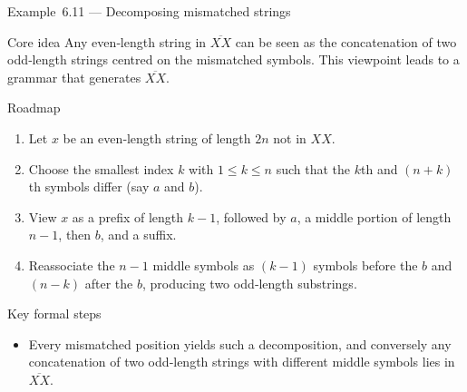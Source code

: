 \begin{frame}[t]{Example 6.11 — Decomposing mismatched strings}
  \begin{tblock}{Core idea}
    Any even‑length string in $\overline{XX}$ can be seen as the
    concatenation of two odd‑length strings centred on the mismatched
    symbols.  This viewpoint leads to a grammar that generates
    $\overline{XX}$.
  \end{tblock}
  \begin{tblock}{Roadmap}
    \begin{enumerate}
      \item Let $x$ be an even‑length string of length $2n$ not in $XX$.
      \item Choose the smallest index $k$ with $1 \le k \le n$ such that
        the $k$th and $(n+k)$th symbols differ (say $a$ and $b$).
      \item View $x$ as a prefix of length $k-1$, followed by $a$, a
        middle portion of length $n-1$, then $b$, and a suffix.
      \item Reassociate the $n-1$ middle symbols as $(k-1)$ symbols
        before the $b$ and $(n-k)$ after the $b$, producing two
        odd‑length substrings.
    \end{enumerate}
  \end{tblock}
  \begin{tblock}{Key formal steps}
    \begin{itemize}
      \item Every mismatched position yields such a decomposition, and
        conversely any concatenation of two odd‑length strings with
        different middle symbols lies in $\overline{XX}$.
    \end{itemize}
  \end{tblock}
  \label{fr:6.2-06}
\end{frame}

